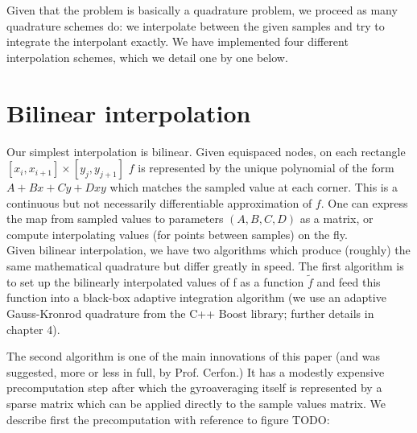Given that the problem is basically a quadrature problem, we proceed as many quadrature schemes do: we interpolate between the given samples and try to integrate the interpolant exactly.  We have implemented four different interpolation schemes, which we detail one by one below.

\section{Bilinear interpolation}
Our simplest interpolation is bilinear.  Given equispaced nodes, on each rectangle $[x_i,x_{i+1}] \times [y_j, y_{j+1}]$ $f$ is represented by the unique polynomial of the form $A + Bx + Cy + Dxy$ which matches the sampled value at each corner.  This is a continuous but not necessarily differentiable approximation of $f$.  One can express the map from sampled values to parameters $(A,B,C,D)$ as a matrix, or compute interpolating values (for points between samples) on the fly.  \\

Given bilinear interpolation, we have two algorithms which produce (roughly) the same mathematical quadrature but differ greatly in speed.  The first algorithm is to set up the bilinearly interpolated values of f as a function $\tilde{f}$ and feed this function into a black-box adaptive integration algorithm (we use an adaptive Gauss-Kronrod quadrature from the C++ Boost library; further details in chapter 4).

The second algorithm is one of the main innovations of this paper (and was suggested, more or less in full, by Prof. Cerfon.)  It has a modestly expensive precomputation step after which the gyroaveraging itself is represented by a sparse matrix which can be applied directly to the sample values matrix.  We describe first the precomputation with reference to figure TODO:

